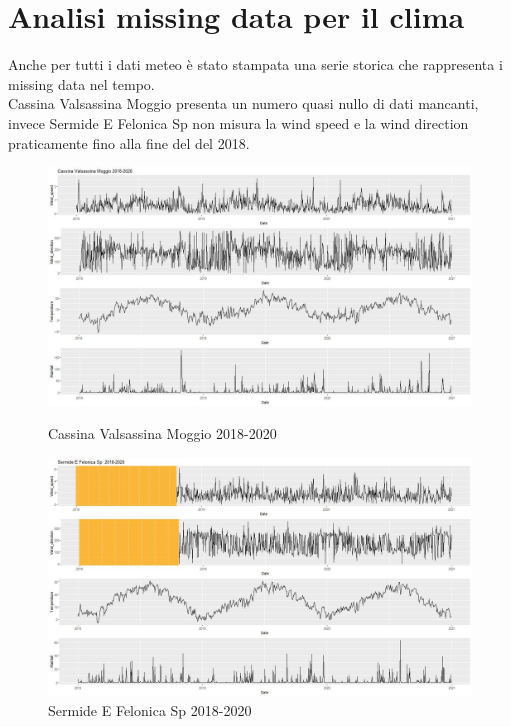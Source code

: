 \documentclass{article}
\begin{document}
\section{Analisi missing data per il clima}
Anche per tutti i dati meteo è stato stampata una serie storica che rappresenta i missing data nel tempo.
\\Cassina Valsassina Moggio presenta un numero quasi nullo di dati mancanti, invece Sermide E Felonica Sp 
non misura la wind speed e la wind direction praticamente fino alla fine del del 2018.
\begin{figure}[H]
  \centering
  \includegraphics[scale=0.35]{Picture/Cassina Valsassina Moggio 2018-2020 .jpeg} 
  \caption{Cassina Valsassina Moggio 2018-2020}
  \centering
  \includegraphics[scale=0.35]{Picture/Sermide.jpeg}
  \caption{Sermide E Felonica Sp  2018-2020}
\end{figure}
\end{document}
